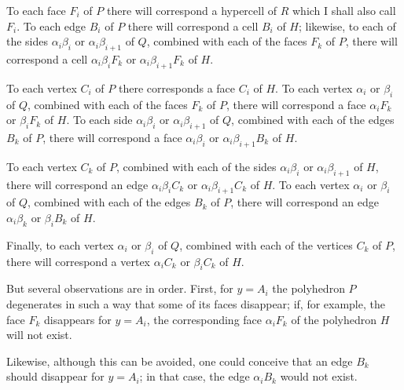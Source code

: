 \documentclass{article}
\begin{document}
To each face $F_{i}$ of $P$ there will correspond a hypercell of $R$ which I shall also call $F_{i}$. To each edge $B_{i}$ of $P$ there will correspond a cell $B_{i}$ of $H$; likewise, to each of the sides $\alpha_{i}\beta_{i}$ or $\alpha_{i}\beta_{i+1}$ of $Q$, combined with each of the faces $F_{k}$ of $P$, there will correspond a cell $\alpha_{i}\beta_{i}F_{k}$ or $\alpha_{i}\beta_{i+1}F_{k}$ of $H$.

To each vertex $C_{i}$ of $P$ there corresponds a face $C_{i}$ of $H$. To each vertex $\alpha_{i}$ or $\beta_{i}$ of $Q$, combined with each of the faces $F_{k}$ of $P$, there will correspond a face $\alpha_{i}F_{k}$ or $\beta_{i}F_{k}$ of $H$. To each side $\alpha_{i}\beta_{i}$ or $\alpha_{i}\beta_{i+1}$ of $Q$, combined with each of the edges $B_{k}$ of $P$, there will correspond a face $\alpha_{i}\beta_{i}$ or $\alpha_{i}\beta_{i+1}B_{k}$ of $H$.

To each vertex $C_{k}$ of $P$, combined with each of the sides $\alpha_{i}\beta_{i}$ or $\alpha_{i}\beta_{i+1}$ of $H$, there will correspond an edge $\alpha_{i}\beta_{i}C_{k}$ or $\alpha_{i}\beta_{i+1}C_{k}$ of $H$. To each vertex $\alpha_{i}$ or $\beta_{i}$ of $Q$, combined with each of the edges $B_{k}$ of $P$, there will correspond an edge $\alpha_{i}\beta_{k}$ or $\beta_{i}B_{k}$ of $H$.

Finally, to each vertex $\alpha_{i}$ or $\beta_{i}$ of $Q$, combined with each of the vertices $C_{k}$ of $P$, there will correspond a vertex $\alpha_{i}C_{k}$ or $\beta_{i}C_{k}$ of $H$.


But several observations are in order. First, for $y = A_{i}$ the polyhedron $P$ degenerates in such a way that some of its faces disappear; if, for example, the face $F_{k}$ disappears for $y = A_{i}$, the corresponding face $\alpha_{i}F_{k}$ of the polyhedron $H$ will not exist.

Likewise, although this can be avoided, one could conceive that an edge $B_{k}$ should disappear for $y = A_{i}$; in that case, the edge $\alpha_{i}B_{k}$ would not exist.
\end{document}
